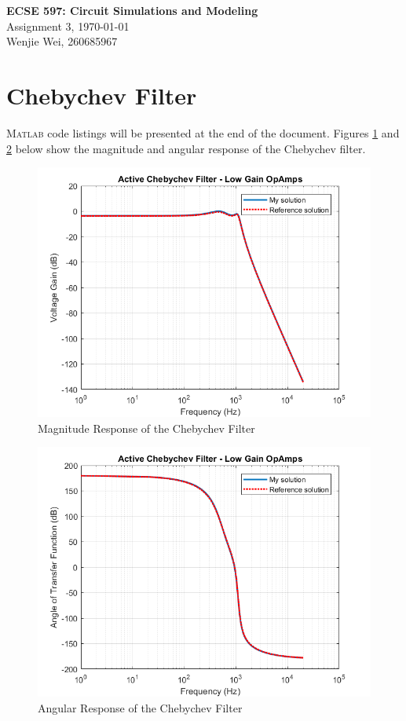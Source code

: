 \documentclass[a4paper,titlepage]{article}
\newcommand{\MATLAB}{\textsc{Matlab}\xspace}
\begin{document}
	\sloppy	
	
	\begin{center}
		{\LARGE \bf ECSE 597: Circuit Simulations and Modeling}\\
		{\large Assignment 3, \quad \today}\\
		{\large Wenjie Wei, 260685967}
	\end{center}

	
	\section{Chebychev Filter}		
		\MATLAB code listings will be presented at the end of the document. Figures \ref{chebychev_mag} and \ref{chebychev_angle} below show the magnitude and angular response of the Chebychev filter. 
		
		\begin{figure}[H]
			\centering
			\includegraphics[width=0.7\linewidth]{../../src/a3/plots/chebychev_gain}
			\caption{Magnitude Response of the Chebychev Filter}
			\label{chebychev_mag}
		\end{figure}
		\begin{figure}[H]
			\centering
			\includegraphics[width=0.7\linewidth]{../../src/a3/plots/chebychev_angle}
			\caption{Angular Response of the Chebychev Filter}
			\label{chebychev_angle}
		\end{figure}
	
\end{document}

